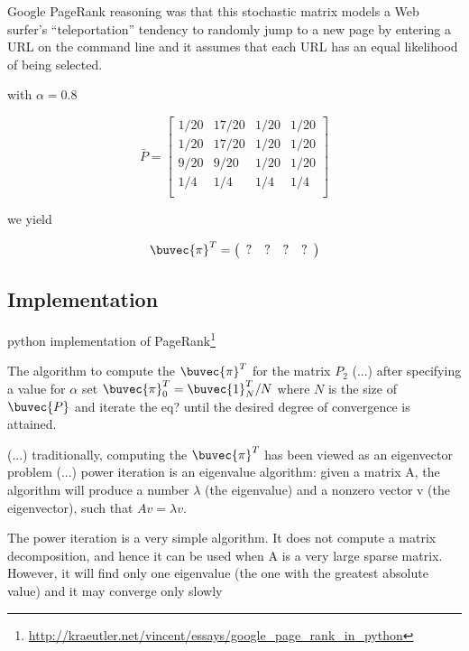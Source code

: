 Google PageRank \cite{page98} reasoning was that this stochastic matrix models a Web surfer's ``teleportation'' tendency to randomly jump to a new page by entering a URL on the command line and it assumes that each URL has an equal likelihood of being selected.

with $\alpha=0.8$

\begin{equation}
\bar{P} =
 \left[
 \begin{array}{cccc}
  1/20 & 17/20 & 1/20 & 1/20 \\
  1/20 & 17/20 & 1/20 & 1/20 \\
  9/20 &  9/20 & 1/20 & 1/20 \\
  1/4 & 1/4 & 1/4 & 1/4 \\
 \end{array}
 \right]
\end{equation}

we yield

\begin{equation}
\buvec{\pi}^T =
\left(
\begin{array}{cccc}
  ? & ? & ? & ? \\
 \end{array}
\right)
\end{equation}

\subsection{Implementation}


python  implementation of PageRank\footnote{\url{http://kraeutler.net/vincent/essays/google\_page\_rank\_in\_python}}

The algorithm to compute the $\buvec{\pi}^T$ for the matrix $P_2$ (...) after specifying a value for $\alpha$ set $\buvec{\pi}_0^T = \buvec{1}_N^T/N$ where $N$ is the size of $\buvec{P}$ and iterate the eq? until the desired degree of convergence is attained.

(...) traditionally, computing the $\buvec{\pi}^T$ has been viewed as an eigenvector problem (...) power iteration is an eigenvalue algorithm: given a matrix A, the algorithm will produce a number $\lambda$ (the eigenvalue) and a nonzero vector v (the eigenvector), such that $Av = \lambda v$.

The power iteration is a very simple algorithm. It does not compute a matrix decomposition, and hence it can be used when A is a very large sparse matrix. However, it will find only one eigenvalue (the one with the greatest absolute value) and it may converge only slowly

